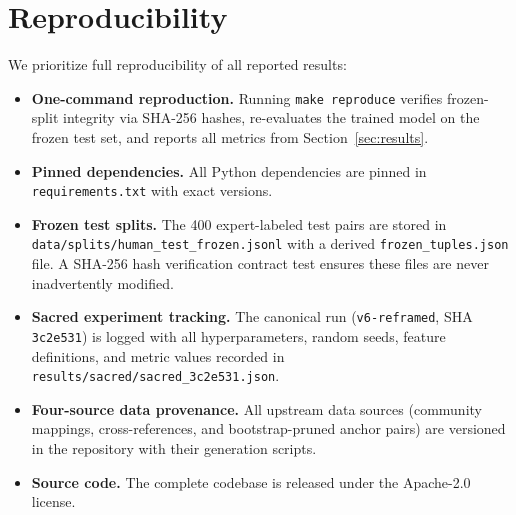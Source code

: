 \section{Reproducibility}
\label{sec:reproducibility}

We prioritize full reproducibility of all reported results:

\begin{itemize}
    \item \textbf{One-command reproduction.} Running \texttt{make
          reproduce} verifies frozen-split integrity via SHA-256 hashes,
          re-evaluates the trained model on the frozen test set, and
          reports all metrics from Section~\ref{sec:results}.
    \item \textbf{Pinned dependencies.} All Python dependencies are
          pinned in \texttt{requirements.txt} with exact versions.
    \item \textbf{Frozen test splits.} The 400 expert-labeled test
          pairs are stored in
          \texttt{data/splits/human\_test\_frozen.jsonl} with a derived
          \texttt{frozen\_tuples.json} file. A SHA-256 hash verification
          contract test ensures these files are never inadvertently
          modified.
    \item \textbf{Sacred experiment tracking.} The canonical run
          (\texttt{v6-reframed}, SHA \texttt{3c2e531}) is logged with
          all hyperparameters, random seeds, feature definitions, and
          metric values recorded in
          \texttt{results/sacred/sacred\_3c2e531.json}.
    \item \textbf{Four-source data provenance.} All upstream data
          sources (community mappings, cross-references, and
          bootstrap-pruned anchor pairs) are versioned in the
          repository with their generation scripts.
    \item \textbf{Source code.} The complete codebase is released under
          the Apache-2.0 license.
\end{itemize}
